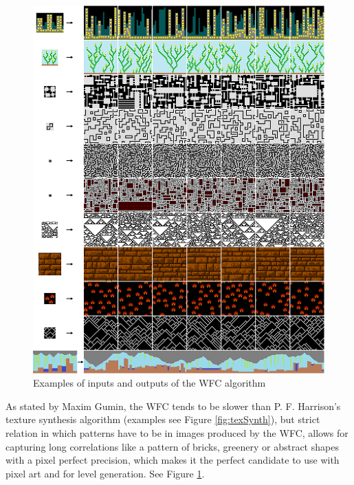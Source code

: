 \documentclass[shortabstract, english, inz]{iithesis}
\begin{document}
\begin{figure}[H]
\centering
\includegraphics[width=1\textwidth, angle=0]{images/wfc.png}
\caption{Examples of inputs and outputs of the WFC algorithm \cite{MaximGumin}}
\label{fig:wfc}
\end{figure}
As stated by Maxim Gumin, the WFC tends to be slower than P. F. Harrison's texture synthesis algorithm (examples see Figure \ref{fig:texSynth}), but strict relation in which patterns have to be in images produced by the WFC, allows for capturing long correlations like a pattern of bricks, greenery or abstract shapes with a pixel perfect precision, which makes it the perfect candidate to use with pixel art and for level generation. See Figure \ref{fig:wfc}. \cite{MaximGumin}
\end{document}
